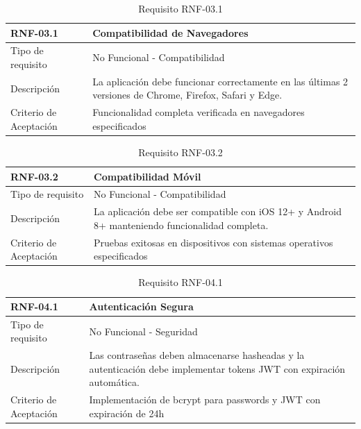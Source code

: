 
\begin{table}[H]
\centering
\begin{tabular}{|p{3cm}|p{10cm}|}
\hline
\rowcolor{tealblue}
{\textbf{RNF-03.1}} & {\textbf{Compatibilidad de Navegadores}} \\
\hline
Tipo de requisito & No Funcional - Compatibilidad \\
\hline
Descripción & La aplicación debe funcionar correctamente en las últimas 2 versiones de Chrome, Firefox, Safari y Edge. \\
\hline
Criterio de Aceptación & Funcionalidad completa verificada en navegadores especificados \\
\hline
\end{tabular}
\caption{Requisito RNF-03.1}
\end{table}

\begin{table}[H]
\centering
\begin{tabular}{|p{3cm}|p{10cm}|}
\hline
\rowcolor{tealblue}
{\textbf{RNF-03.2}} & {\textbf{Compatibilidad Móvil}} \\
\hline
Tipo de requisito & No Funcional - Compatibilidad \\
\hline
Descripción & La aplicación debe ser compatible con iOS 12+ y Android 8+ manteniendo funcionalidad completa. \\
\hline
Criterio de Aceptación & Pruebas exitosas en dispositivos con sistemas operativos especificados \\
\hline
\end{tabular}
\caption{Requisito RNF-03.2}
\end{table}


\begin{table}[H]
\centering
\begin{tabular}{|p{3cm}|p{10cm}|}
\hline
\rowcolor{tealblue}
{\textbf{RNF-04.1}} & {\textbf{Autenticación Segura}} \\
\hline
Tipo de requisito & No Funcional - Seguridad \\
\hline
Descripción & Las contraseñas deben almacenarse hasheadas y la autenticación debe implementar tokens JWT con expiración automática. \\
\hline
Criterio de Aceptación & Implementación de bcrypt para passwords y JWT con expiración de 24h \\
\hline
\end{tabular}
\caption{Requisito RNF-04.1}
\end{table}

